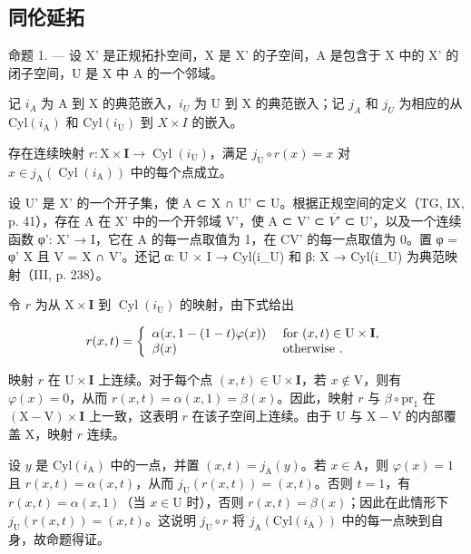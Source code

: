 \subsection{同伦延拓}

命题 1. --- 设 X' 是正规拓扑空间，X 是 X' 的子空间，A 是包含于 X 中的 X' 的闭子空间，U 是 X 中 A 的一个邻域。

记 \(i_{A}\) 为 A 到 X 的典范嵌入，\(i_{U}\) 为 U 到 X 的典范嵌入；记 \(j_{A}\) 和 \(j_{U}\) 为相应的从 \(\mathrm{Cyl}(i_{\mathrm{A}})\) 和 \(\mathrm{Cyl}(i_{\mathrm{U}})\) 到 \(X \times I\) 的嵌入。

存在连续映射 \(r \colon \mathrm{X} \times \mathbf{I} \to \operatorname{Cyl}(i_{\mathrm{U}})\)，满足 \(j_{\mathrm{U}} \circ r(x) = x\) 对 \(x \in j_{\mathrm{A}}(\operatorname{Cyl}(i_{\mathrm{A}}))\) 中的每个点成立。

设 U' 是 X' 的一个开子集，使 A ⊂ X ∩ U' ⊂ U。根据正规空间的定义（TG, IX, p. 41），存在 A 在 X' 中的一个开邻域 V'，使 A ⊂ V' ⊂ \(\overline{V'}\) ⊂ U'，以及一个连续函数 φ': X' → I，它在 A 的每一点取值为 1，在 CV' 的每一点取值为 0。置 φ = φ' \textbar{} X 且 V = X ∩ V'。还记 α: U × I → Cyl(i\_U) 和 β: X → Cyl(i\_U) 为典范映射（III, p. 238）。

令 \(r\) 为从 \(\mathrm{X} \times \mathbf{I}\) 到 \(\operatorname{Cyl}(i_{\mathrm{U}})\) 的映射，由下式给出

\[
r (x, t) = \left\{ \begin{array}{l l} \alpha (x, 1 - (1 - t) \varphi (x)) & \text { for } (x, t) \in \mathrm{U} \times \mathbf {I}, \\ \beta (x) & \text { otherwise }. \end{array} \right.
\]

映射 \(r\) 在 \(\mathrm{U} \times \mathbf{I}\) 上连续。对于每个点 \((x, t) \in \mathrm{U} \times \mathbf{I}\)，若 \(x \notin \mathrm{V}\)，则有 \(\varphi(x) = 0\)，从而 \(r(x, t) = \alpha(x, 1) = \beta(x)\)。因此，映射 \(r\) 与 \(\beta \circ \mathrm{pr}_1\) 在 \((\mathrm{X} - \mathrm{V}) \times \mathbf{I}\) 上一致，这表明 \(r\) 在该子空间上连续。由于 U 与 \(\mathrm{X} - \mathrm{V}\) 的内部覆盖 X，映射 \(r\) 连续。

设 \(y\) 是 \(\mathrm{Cyl}(i_{\mathrm{A}})\) 中的一点，并置 \((x,t) = j_{\mathrm{A}}(y)\)。若 \(x \in \mathrm{A}\)，则 \(\varphi(x) = 1\) 且 \(r(x,t) = \alpha(x,t)\)，从而 \(j_{\mathrm{U}}(r(x,t)) = (x,t)\)。否则 \(t = 1\)，有 \(r(x,t) = \alpha(x,1)\)（当 \(x \in \mathrm{U}\) 时），否则 \(r(x,t) = \beta(x)\)；因此在此情形下 \(j_{\mathrm{U}}(r(x,t)) = (x,t)\)。这说明 \(j_{\mathrm{U}} \circ r\) 将 \(j_{\mathrm{A}}(\mathrm{Cyl}(i_{\mathrm{A}}))\) 中的每一点映到自身，故命题得证。

